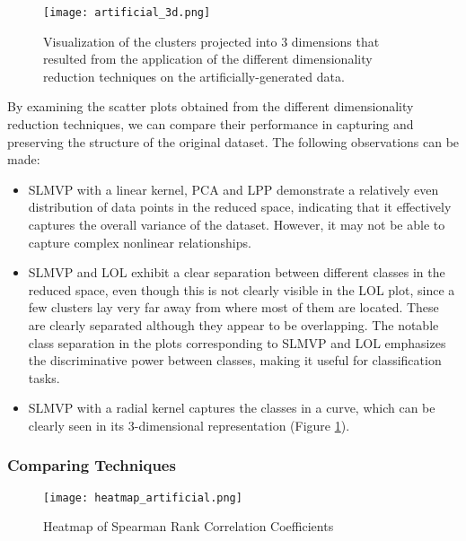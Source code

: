 \begin{figure}[!ht]
    \centering
    \texttt{[image: artificial\_3d.png]}
    \caption{Visualization of the clusters projected into 3 dimensions that resulted from the application of the different dimensionality reduction techniques on the artificially-generated data.}
    \label{fig:artificial_3d}
\end{figure}

By examining the scatter plots obtained from the different dimensionality reduction techniques, we can compare their performance in capturing and preserving the structure of the original dataset. The following observations can be made:

\begin{itemize}
    \item SLMVP with a linear kernel, PCA and LPP demonstrate a relatively even distribution of data points in the reduced space, indicating that it effectively captures the overall variance of the dataset. However, it may not be able to capture complex nonlinear relationships.
    \item SLMVP and LOL exhibit a clear separation between different classes in the reduced space, even though this is not clearly visible in the LOL plot, since a few clusters lay very far away from where most of them are located. These are clearly separated although they appear to be overlapping. The notable class separation in the plots corresponding to SLMVP and LOL emphasizes the discriminative power between classes, making it useful for classification tasks.
    \item SLMVP with a radial kernel captures the classes in a curve, which can be clearly seen in its 3-dimensional representation (Figure \ref{fig:artificial_3d}).
\end{itemize}

\subsubsection{Comparing Techniques}

\begin{figure}[!h]
    \centering
    \texttt{[image: heatmap\_artificial.png]}
    \caption{Heatmap of Spearman Rank Correlation Coefficients}
    \label{fig:heatmap-artificial}
\end{figure}


